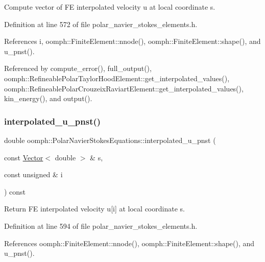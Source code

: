 Compute vector of FE interpolated velocity u at local coordinate s. 



Definition at line 572 of file polar\+\_\+navier\+\_\+stokes\+\_\+elements.\+h.



References i, oomph\+::\+Finite\+Element\+::nnode(), oomph\+::\+Finite\+Element\+::shape(), and u\+\_\+pnst().



Referenced by compute\+\_\+error(), full\+\_\+output(), oomph\+::\+Refineable\+Polar\+Taylor\+Hood\+Element\+::get\+\_\+interpolated\+\_\+values(), oomph\+::\+Refineable\+Polar\+Crouzeix\+Raviart\+Element\+::get\+\_\+interpolated\+\_\+values(), kin\+\_\+energy(), and output().

\mbox{\label{classoomph_1_1PolarNavierStokesEquations_a0913099164d0d4762b67aa0c0f46a39e}} 
\subsubsection{\texorpdfstring{interpolated\+\_\+u\+\_\+pnst()}{interpolated\_u\_pnst()}\hspace{0.1cm}{\footnotesize\ttfamily [2/2]}}
{\footnotesize\ttfamily double oomph\+::\+Polar\+Navier\+Stokes\+Equations\+::interpolated\+\_\+u\+\_\+pnst (\begin{DoxyParamCaption}\item[{const \hyperlink{classoomph_1_1Vector}{Vector}$<$ double $>$ \&}]{s,  }\item[{const unsigned \&}]{i }\end{DoxyParamCaption}) const\hspace{0.3cm}{\ttfamily [inline]}}



Return FE interpolated velocity u\mbox{[}i\mbox{]} at local coordinate s. 



Definition at line 594 of file polar\+\_\+navier\+\_\+stokes\+\_\+elements.\+h.



References oomph\+::\+Finite\+Element\+::nnode(), oomph\+::\+Finite\+Element\+::shape(), and u\+\_\+pnst().

